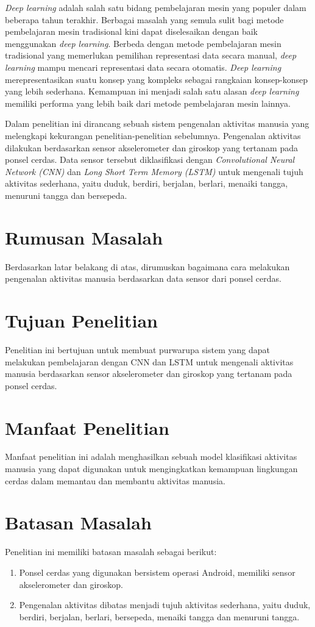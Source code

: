 \emph{Deep learning} adalah salah satu bidang pembelajaran mesin yang populer dalam beberapa tahun terakhir. Berbagai masalah yang semula sulit bagi metode pembelajaran mesin tradisional kini dapat diselesaikan dengan baik menggunakan \emph{deep learning}. Berbeda dengan metode pembelajaran mesin tradisional yang memerlukan pemilihan representasi data secara manual, \emph{deep learning} mampu mencari representasi data secara otomatis. \emph{Deep learning} merepresentasikan suatu konsep yang kompleks sebagai rangkaian konsep-konsep yang lebih sederhana. Kemampuan ini menjadi salah satu alasan \emph{deep learning} memiliki performa yang lebih baik dari metode pembelajaran mesin lainnya.

Dalam penelitian ini dirancang sebuah sistem pengenalan aktivitas manusia yang melengkapi kekurangan penelitian-penelitian sebelumnya. Pengenalan aktivitas dilakukan berdasarkan sensor akselerometer dan giroskop yang tertanam pada ponsel cerdas. Data sensor tersebut diklasifikasi dengan \emph{Convolutional Neural Network (CNN)} dan \emph{Long Short Term Memory (LSTM)} untuk mengenali tujuh aktivitas sederhana, yaitu duduk, berdiri, berjalan, berlari, menaiki tangga, menuruni tangga dan bersepeda.

\section{Rumusan Masalah}
Berdasarkan latar belakang di atas, dirumuskan bagaimana cara melakukan pengenalan aktivitas manusia berdasarkan data sensor dari ponsel cerdas.

\section{Tujuan Penelitian}
Penelitian ini bertujuan untuk membuat purwarupa sistem yang dapat melakukan pembelajaran dengan CNN dan LSTM untuk mengenali aktivitas manusia berdasarkan sensor akselerometer dan giroskop yang tertanam pada ponsel cerdas.

\section{Manfaat Penelitian}
Manfaat penelitian ini adalah menghasilkan sebuah model klasifikasi aktivitas manusia yang dapat digunakan untuk mengingkatkan kemampuan lingkungan cerdas dalam memantau dan membantu aktivitas manusia.

\section{Batasan Masalah}
Penelitian ini memiliki batasan masalah sebagai berikut:

\begin{enumerate}
\item Ponsel cerdas yang digunakan bersistem operasi Android, memiliki sensor akselerometer dan giroskop.
\item Pengenalan aktivitas dibatas menjadi tujuh aktivitas sederhana, yaitu duduk, berdiri, berjalan, berlari, bersepeda, menaiki tangga dan menuruni tangga.
\end{enumerate}
